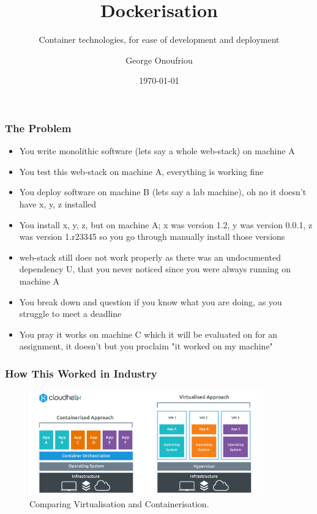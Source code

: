 \documentclass{beamer}
\title{Dockerisation}
\subtitle{Container technologies, for ease of development and deployment}
\author{George Onoufriou}
\date{\today}
\begin{document}
  \frame{\titlepage}

  \begin{frame}
    \frametitle{The Problem}
    \begin{itemize}
        \item You write monolithic software (lets say a whole web-stack) on machine A
        \item You test this web-stack on machine A, everything is working fine
        \item You deploy software on machine B (lets say a lab machine), oh no it doesn't have x, y, z installed
        \item You install x, y, z, but on machine A; x was version 1.2, y was version 0.0.1, z was version 1.r23345 so you go through manually install those versions
        \item web-stack still does not work properly as there was an undocumented dependency U, that you never noticed since you were always running on machine A
        \item You break down and question if you know what you are doing, as you struggle to meet a deadline
        \item You pray it works on machine C which it will be evaluated on for an assignment, it doesn't but you proclaim "it worked on my machine"
    \end{itemize}
  \end{frame}

  \begin{frame}
    \frametitle{How This Worked in Industry}
    \begin{figure}[th!]
      \centering
      \includegraphics[width=0.9\textwidth]{containerisation.png}
      \caption{Comparing Virtualisation and Containerisation.}
      \label{fig:containerisation}
    \end{figure}
  \end{frame}
\end{document}
